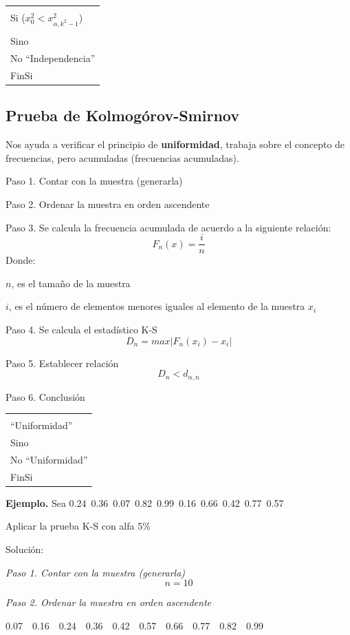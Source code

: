 \documentclass[11pt,letterpaper]{report}
\newenvironment{algoritmo}
  {\begin{center}\begin{tabular}{|p{0.85\textwidth}|}\hline\vspace{-0.2cm}\begin{tabbing}\hspace{0.6cm}\=\hspace{0.6cm}\=\hspace{0.6cm}\=\hspace{0.6cm}\=\hspace{0.6cm}\=\kill}
  {\end{tabbing}\vspace{-0.4cm}\\\hline\end{tabular}\end{center}}
\begin{document}
\begin{algoritmo}
\>$7 < 25$\\
\>Si ($x_0^2 < x_{\alpha,k^2-1}^2$)\\
\>\>\fbox{``Independencia''}\\
\>Sino\\
\>\>No ``Independencia''\\
\>FinSi
\end{algoritmo}

\subsection*{Prueba de Kolmogórov-Smirnov}

Nos ayuda a verificar el principio de \textbf{uniformidad}, trabaja sobre el concepto de frecuencias, pero acumuladas (frecuencias acumuladas).

Paso 1. Contar con la muestra (generarla)

Paso 2. Ordenar la muestra en orden ascendente

Paso 3. Se calcula la frecuencia acumulada de acuerdo a la siguiente relación:
\[
F_n(x) = \frac{i}{n}
\]
Donde:

$n$, es el tamaño de la muestra

$i$, es el número de elementos menores iguales al elemento de la muestra $x_i$

Paso 4. Se calcula el estadístico K-S
\[
D_n = max|F_n(x_i) - x_i|
\]

Paso 5. Establecer relación
\[
D_n < d_{\alpha,n}
\]

Paso 6. Conclusión

\begin{algoritmo}
\>Si ($D_n < d_{\alpha,n}$)\\
\>\>``Uniformidad''\\
\>Sino\\
\>\>No ``Uniformidad''\\
\>FinSi
\end{algoritmo}

\textbf{Ejemplo.} Sea 0.24\ 0.36\ 0.07\ 0.82\ 0.99\ 0.16\ 0.66\ 0.42\ 0.77\ 0.57

Aplicar la prueba K-S con alfa 5\%

Solución:

\textit{Paso 1. Contar con la muestra (generarla)}
\[
n = 10
\]

\textit{Paso 2. Ordenar la muestra en orden ascendente}

0.07\ \ 0.16\ \ 0.24\ \ 0.36\ \ 0.42\ \ 0.57\ \ 0.66\ \ 0.77\ \ 0.82\ \ 0.99
\end{document}
